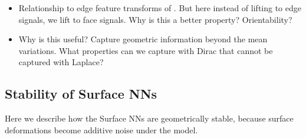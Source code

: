 


\begin{itemize}
\item Relationship to edge feature transforms of \cite{quantum_chemistry}.
But here instead of lifting to edge signals, we lift to face signals. Why is
this a better property? Orientability? 

\item Why is this useful? 
Capture geometric information beyond the mean variations. What properties 
can we capture with Dirac that cannot be captured with Laplace? 
\end{itemize}

\subsection{Stability of Surface NNs}
\label{stabsection}

Here we describe how the Surface NNs are geometrically stable, 
because surface deformations become additive noise under the model. 

